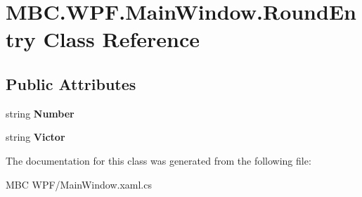 \hypertarget{class_m_b_c_1_1_w_p_f_1_1_main_window_1_1_round_entry}{\section{M\-B\-C.\-W\-P\-F.\-Main\-Window.\-Round\-Entry Class Reference}
\label{class_m_b_c_1_1_w_p_f_1_1_main_window_1_1_round_entry}
}
\subsection*{Public Attributes}
\begin{DoxyCompactItemize}
\item 
\hypertarget{class_m_b_c_1_1_w_p_f_1_1_main_window_1_1_round_entry_ac8491f1bf15d2fcb9ebd151c5efa3d77}{string {\bfseries Number}}\label{class_m_b_c_1_1_w_p_f_1_1_main_window_1_1_round_entry_ac8491f1bf15d2fcb9ebd151c5efa3d77}

\item 
\hypertarget{class_m_b_c_1_1_w_p_f_1_1_main_window_1_1_round_entry_aaca7d42e0063db62092deff7ec7a4668}{string {\bfseries Victor}}\label{class_m_b_c_1_1_w_p_f_1_1_main_window_1_1_round_entry_aaca7d42e0063db62092deff7ec7a4668}

\end{DoxyCompactItemize}


The documentation for this class was generated from the following file\-:\begin{DoxyCompactItemize}
\item 
M\-B\-C W\-P\-F/Main\-Window.\-xaml.\-cs\end{DoxyCompactItemize}
